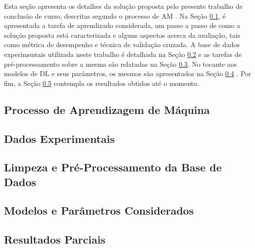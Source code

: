 Esta seção apresenta os detalhes da solução proposta pelo presente trabalho de conclusão de curso, descritas segundo o processo de AM \cite[vide Seção 1.5]{ref:marsland}. Na Seção  \ref{subsec:tarefa}, é apresentada a tarefa de aprendizado considerada, um passo a passo de como a solução proposta está caracterizada e alguns aspectos acerca da avaliação, tais como métrica de desempenho e técnica de validação cruzada. A base de dados experimentais utilizada neste trabalho é detalhada na Seção \ref{subsec:dados} e as tarefas de pré-processamento sobre a mesma são relatadas na Seção \ref{subsec:pre-process}. No tocante aos modelos de DL e seus parâmetros, os mesmos são apresentados na Seção \ref{subsec:modelos} . Por fim, a Seção \ref{subsec:resultados} contempla os resultados obtidos até o momento.

\subsection{Processo de Aprendizagem de Máquina} \label{subsec:tarefa}


\subsection{Dados Experimentais} \label{subsec:dados}


\subsection{Limpeza e Pré-Processamento da Base de Dados} \label{subsec:pre-process}


\subsection{Modelos e Parâmetros Considerados} \label{subsec:modelos}


\subsection{Resultados Parciais}
\label{subsec:resultados}




%
